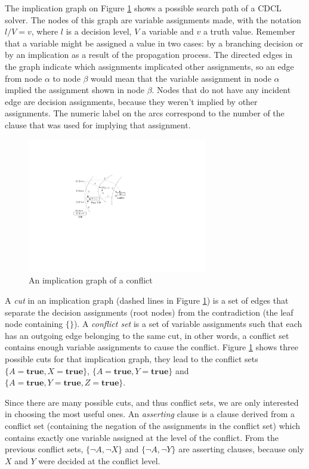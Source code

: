 \documentclass[12pt]{diicc}
\begin{document}
The implication graph on Figure \ref{fig:uip} shows a possible search path of a CDCL solver. The nodes of this graph are variable assignments made, with the notation $l/V=v$, where $l$ is a decision level, $V$ a variable and $v$ a truth value. Remember that a variable might be assigned a value in two cases: by a branching decision or by an implication as a result of the propagation process. The directed edges in the graph indicate which assignments implicated other assignments, so an edge from node $\alpha$ to node $\beta$ would mean that the variable assignment in node $\alpha$ implied the assignment shown in node $\beta$. Nodes that do not have any incident edge are decision assignments, because they weren't implied by other assignments. The numeric label on the arcs correspond to the number of the clause that was used for implying that assignment. 

\begin{figure}[h!]
	\centering
		\includegraphics[width=0.7\textwidth]{uip}
	\caption{An implication graph of a conflict}
	\label{fig:uip}
\end{figure}

A \textit{cut} in an implication graph (dashed lines in Figure \ref{fig:uip}) is a set of edges that separate the decision assignments (root nodes) from the contradiction (the leaf node containing $\{\}$). A \textit{conflict set} is a set of variable assignments such that each has an outgoing edge belonging to the same cut, in other words, a conflict set contains enough variable assignments to cause the conflict. Figure \ref{fig:uip} shows three possible cuts for that implication graph, they lead to the conflict sets $\{A=\textbf{true},X=\textbf{true}\}$, $\{A=\textbf{true},Y=\textbf{true}\}$ and $\{A=\textbf{true},Y=\textbf{true},Z=\textbf{true}\}$.

Since there are many possible cuts, and thus conflict sets, we are only interested in choosing the most useful ones. An \textit{asserting} clause \cite{cdcl1} is a clause derived from a conflict set (containing the negation of the assignments in the conflict set) which contains exactly one variable assigned at the level of the conflict. From the previous conflict sets, $\{\neg A,\neg X\}$ and $\{\neg A,\neg Y\}$ are asserting clauses, because only $X$ and $Y$ were decided at the conflict level. 
\end{document}
